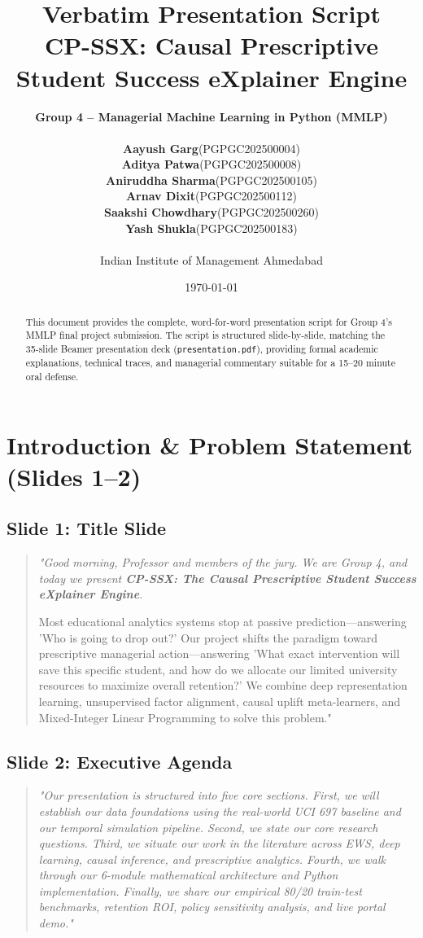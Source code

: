 \documentclass[11pt, a4paper]{article}
\title{\LARGE \textbf{Verbatim Presentation Script}\\[0.3em]
\Large CP-SSX: Causal Prescriptive Student Success eXplainer Engine}
\author{
    \textbf{Group 4 -- Managerial Machine Learning in Python (MMLP)}\\[0.5em]
    \small
    \begin{tabular}{c c}
        \textbf{Aayush Garg} & (PGPGC202500004) \\
        \textbf{Aditya Patwa} & (PGPGC202500008) \\
        \textbf{Aniruddha Sharma} & (PGPGC202500105) \\
        \textbf{Arnav Dixit} & (PGPGC202500112) \\
        \textbf{Saakshi Chowdhary} & (PGPGC202500260) \\
        \textbf{Yash Shukla} & (PGPGC202500183) \\
    \end{tabular}\\[0.5em]
    \small Indian Institute of Management Ahmedabad
}
\date{\today}
\begin{document}
\maketitle

\begin{abstract}
\noindent This document provides the complete, word-for-word presentation script for Group 4's MMLP final project submission. The script is structured slide-by-slide, matching the 35-slide Beamer presentation deck (\texttt{presentation.pdf}), providing formal academic explanations, technical traces, and managerial commentary suitable for a 15--20 minute oral defense.
\end{abstract}

\tableofcontents
\newpage

\section{Introduction \& Problem Statement (Slides 1--2)}

\subsection{Slide 1: Title Slide}
\begin{quote}\small \itshape
"Good morning, Professor and members of the jury. We are Group 4, and today we present \textbf{CP-SSX: The Causal Prescriptive Student Success eXplainer Engine}. 

Most educational analytics systems stop at passive prediction---answering 'Who is going to drop out?' Our project shifts the paradigm toward prescriptive managerial action---answering 'What exact intervention will save this specific student, and how do we allocate our limited university resources to maximize overall retention?' We combine deep representation learning, unsupervised factor alignment, causal uplift meta-learners, and Mixed-Integer Linear Programming to solve this problem."
\end{quote}

\subsection{Slide 2: Executive Agenda}
\begin{quote}\small \itshape
"Our presentation is structured into five core sections. First, we will establish our data foundations using the real-world UCI 697 baseline and our temporal simulation pipeline. Second, we state our core research questions. Third, we situate our work in the literature across EWS, deep learning, causal inference, and prescriptive analytics. Fourth, we walk through our 6-module mathematical architecture and Python implementation. Finally, we share our empirical 80/20 train-test benchmarks, retention ROI, policy sensitivity analysis, and live portal demo."
\end{quote}
\end{document}
